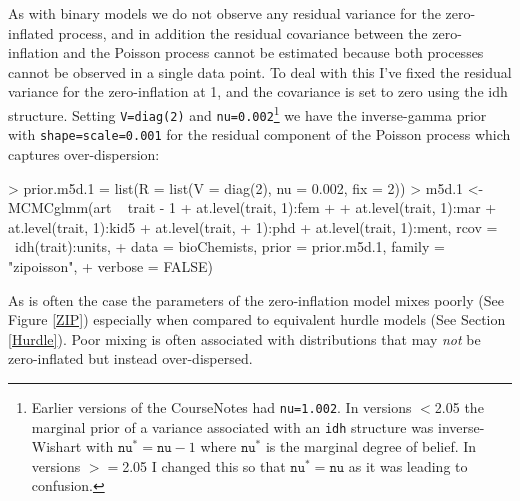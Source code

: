 \documentclass{article}
\begin{document}
As with binary models we do not observe any residual variance for the zero-inflated process, and in addition the residual covariance between the zero-inflation and the Poisson process cannot be estimated because both processes cannot be observed in a single data point. To deal with this I've fixed the residual variance for the zero-inflation at 1, and the covariance is set to zero using the idh structure. Setting \texttt{V=diag(2)} and \texttt{nu=0.002}\footnote{Earlier versions of the CourseNotes had \texttt{nu=1.002}. In versions $<$2.05 the marginal prior of a variance associated with an \texttt{idh} structure was inverse-Wishart with $\texttt{nu}^{\ast}=\texttt{nu}-1$ where $\texttt{nu}^{\ast}$ is the marginal degree of belief. In versions $>=$2.05 I changed this so that $\texttt{nu}^{\ast}=\texttt{nu}$ as it was leading to confusion.} we have the inverse-gamma prior with \texttt{shape=scale=0.001} for the residual component of the Poisson process which captures over-dispersion:

\begin{Schunk}
\begin{Sinput}
> prior.m5d.1 = list(R = list(V = diag(2), nu = 0.002, fix = 2))
> m5d.1 <- MCMCglmm(art ~ trait - 1 + at.level(trait, 1):fem + 
+     at.level(trait, 1):mar + at.level(trait, 1):kid5 + at.level(trait, 
+     1):phd + at.level(trait, 1):ment, rcov = ~idh(trait):units, 
+     data = bioChemists, prior = prior.m5d.1, family = "zipoisson", 
+     verbose = FALSE)
\end{Sinput}
\end{Schunk}

As is often the case the parameters of the zero-inflation model mixes poorly (See Figure \ref{ZIP}) especially when compared to equivalent hurdle models (See Section \ref{Hurdle}). Poor mixing is often associated with distributions that may \emph{not} be zero-inflated but instead over-dispersed.\\  
\end{document}
